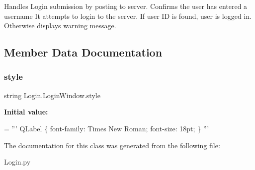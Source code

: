 \begin{DoxyVerb}Handles Login submission by posting to server.
Confirms the user has entered a username
It attempts to login to the server.
If user ID is found, user is logged in.
Otherwise displays warning message.\end{DoxyVerb}
 

\subsection{Member Data Documentation}
\mbox{\label{classLogin_1_1LoginWindow_a1893950a27b708cf283b86f9a55d107a}} 
\subsubsection{\texorpdfstring{style}{style}}
{\footnotesize\ttfamily string Login.\+Login\+Window.\+style\hspace{0.3cm}{\ttfamily [static]}}

{\bfseries Initial value\+:}
\begin{DoxyCode}
= \textcolor{stringliteral}{'''}
\textcolor{stringliteral}{QLabel}
\textcolor{stringliteral}{\{}
\textcolor{stringliteral}{    font-family: Times New Roman;}
\textcolor{stringliteral}{    font-size: 18pt;}
\textcolor{stringliteral}{\}}
\textcolor{stringliteral}{'''}
\end{DoxyCode}


The documentation for this class was generated from the following file\+:\begin{DoxyCompactItemize}
\item 
Login.\+py\end{DoxyCompactItemize}
